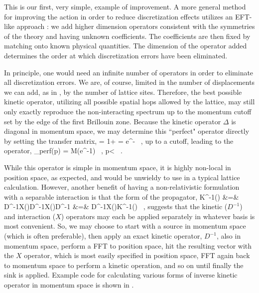 This is our first, very simple, example of improvement. A more general method for improving the action in order to reduce discretization effects utilizes an EFT-like approach \cite{Symanzik1,Symanzik2,Symanzik3,Symanzik4,EKLN4}: we add higher dimension operators consistent with the symmetries of the theory and having unknown coefficients. The coefficients are then fixed by matching onto known physical quantities. The dimension of the operator added determines the order at which discretization errors have been eliminated.

In principle, one would need an infinite number of operators in order to eliminate all discretization errors. We are, of course, limited in the number of displacements we can add, as in , by the number of lattice sites. Therefore, the best possible kinetic operator, utilizing all possible spatial hops allowed by the lattice, may still only exactly reproduce the non-interacting spectrum up to the momentum cutoff set by the edge of the first Brillouin zone. Because the kinetic operator $\Delta$ is diagonal in momentum space, we may determine this ``perfect" operator directly by setting the transfer matrix,
\beq
\calT= 1+ = e^{-} \ ,
\eeq
up to a cutoff, leading to the operator,
\beq
\label{eq:perfect}
\Delta_{\mbox{\tiny perf}}(p) = M\left(e^{}-1\right) \ , \qquad p<  \ .
\eeq

While this operator is simple in momentum space, it is highly non-local in position space, as expected, and would be unwieldy to use in a typical lattice calculation. However, another benefit of having a non-relativistic formulation with a separable interaction is that the form of the propagator, 
\beq
K^{-1}(\tau) &=& D^{-1}X(\tau)D^{-1}X()\cdots D^{-1} \cr
&=& D^{-1}X(\tau)K^{-1}() \ ,
\eeq
suggests that the kinetic ($D^{-1}$) and interaction ($X$) operators may each be applied separately in whatever basis is most convenient. So, we may choose to start with a source in momentum space (which is often preferable), then apply an exact kinetic operator, $D^{-1}$, also in momentum space, perform a FFT to position space, hit the resulting vector with the $X$ operator, which is most easily specified in position space, FFT again back to momentum space to perform a kinetic operation, and so on until finally the sink is applied. Example code for calculating various forms of inverse kinetic operator in momentum space is shown in .

